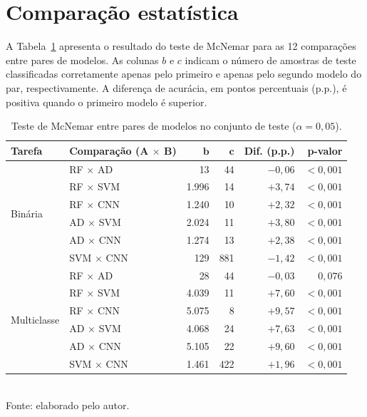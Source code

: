 \section{Comparação estatística}
\label{sec:res-mcnemar}

A Tabela~\ref{tab:mcnemar} apresenta o resultado do teste de McNemar para as 12 comparações entre pares de modelos. As colunas $b$ e $c$ indicam o número de amostras de teste classificadas corretamente apenas pelo primeiro e apenas pelo segundo modelo do par, respectivamente. A diferença de acurácia, em pontos percentuais (p.p.), é positiva quando o primeiro modelo é superior.

\begin{table}[htbp]
\centering
\caption{Teste de McNemar entre pares de modelos no conjunto de teste ($\alpha = 0{,}05$).}
\label{tab:mcnemar}
\small
\begin{tabular}{llrrrr}
\toprule
\textbf{Tarefa} & \textbf{Comparação (A $\times$ B)} & $\boldsymbol{b}$ & $\boldsymbol{c}$ & \textbf{Dif. (p.p.)} & \textbf{p-valor} \\
\midrule
\multirow{6}{*}{Binária}
 & RF $\times$ AD    &    13 &    44 & $-0{,}06$ & $< 0{,}001$ \\
 & RF $\times$ SVM   & 1.996 &    14 & $+3{,}74$ & $< 0{,}001$ \\
 & RF $\times$ CNN   & 1.240 &    10 & $+2{,}32$ & $< 0{,}001$ \\
 & AD $\times$ SVM   & 2.024 &    11 & $+3{,}80$ & $< 0{,}001$ \\
 & AD $\times$ CNN   & 1.274 &    13 & $+2{,}38$ & $< 0{,}001$ \\
 & SVM $\times$ CNN  &   129 &   881 & $-1{,}42$ & $< 0{,}001$ \\
\midrule
\multirow{6}{*}{Multiclasse}
 & RF $\times$ AD    &    28 &    44 & $-0{,}03$ & $0{,}076$ \\
 & RF $\times$ SVM   & 4.039 &    11 & $+7{,}60$ & $< 0{,}001$ \\
 & RF $\times$ CNN   & 5.075 &     8 & $+9{,}57$ & $< 0{,}001$ \\
 & AD $\times$ SVM   & 4.068 &    24 & $+7{,}63$ & $< 0{,}001$ \\
 & AD $\times$ CNN   & 5.105 &    22 & $+9{,}60$ & $< 0{,}001$ \\
 & SVM $\times$ CNN  & 1.461 &   422 & $+1{,}96$ & $< 0{,}001$ \\
\bottomrule
\end{tabular}
\\[2pt]
\small{Fonte: elaborado pelo autor.}
\end{table}

